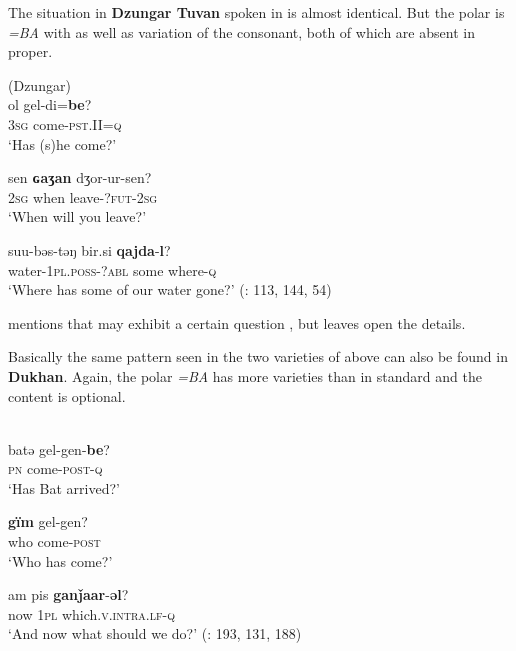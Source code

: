 The situation in \textbf{Dzungar Tuvan} spoken in  is almost identical. But the polar  is \textit{=BA} with  as well as variation of the consonant, both of which are absent in  proper.

\ea%
    \label{ex:turk:44}
     (Dzungar)\\
    \ea
    \gll ol  gel-di=\textbf{{be}}?\\
    3\textsc{sg}  come-\textsc{pst.II=q}\\
    \glt ‘Has (s)he come?’
    
    \ex
    \gll sen \textbf{{ɢaʒan}} dʒor-ur-sen?\\
    2\textsc{sg}  when  leave-?\textsc{fut}-2\textsc{sg}\\
    \glt ‘When will you leave?’
    
    \ex
    \gll suu-bəs-təŋ    bir.si \textbf{{qajda}}-\textbf{{l}}?\\
    water-1\textsc{pl}.\textsc{poss}-?\textsc{abl}  some  where-\textsc{q}\\
    \glt ‘Where has some of our water gone?’ (\citealt{WuHongwei1999}: 113, 144, 54)\z\z

\noindent \citet[146]{WuHongwei1999} mentions that  may exhibit a certain question , but leaves open the details.

Basically the same pattern seen in the two varieties of  above can also be found in \textbf{Dukhan}. Again, the polar  \textit{=BA} has more varieties than in standard  and the content  is optional.

\ea%
    \label{ex:turk:45}
    \\
    \ea
    \gll batə  gel-gen-\textbf{{be}}?\\
    \textsc{pn}  come-\textsc{post}-\textsc{q}\\
    \glt ‘Has Bat arrived?’
    
    \ex
    \gll \textbf{{gïm}} gel-gen?\\
    who  come-\textsc{post}\\
    \glt ‘Who has come?’
    
    \ex
    \gll am  pis \textbf{{ganǰaar}}-\textbf{{əl}}?\\
    now  1\textsc{pl}  which.\textsc{v.intra.lf}-\textsc{q}\\
    \glt ‘And now what should we do?’ (\citealt{Ragagnin2011}: 193, 131, 188)\z\z

